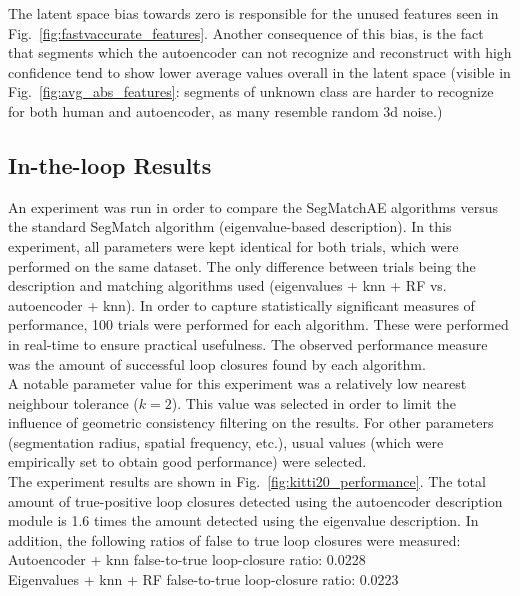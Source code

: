 The latent space bias towards zero is responsible for the unused features seen in Fig.~\ref{fig:fastvaccurate_features}. Another consequence of this bias, is the fact that segments which the autoencoder can not recognize and reconstruct with high confidence tend to show lower average values overall in the latent space (visible in Fig.~\ref{fig:avg_abs_features}: segments of unknown class are harder to recognize for both human and autoencoder, as many resemble random 3d noise.)


\subsection{In-the-loop Results}

An experiment was run in order to compare the SegMatchAE algorithms versus the standard SegMatch algorithm (eigenvalue-based description). In this experiment, all parameters were kept identical for both trials, which were performed on the same dataset. The only difference between trials being the description and matching algorithms used (eigenvalues + knn + RF vs. autoencoder + knn). In order to capture statistically significant measures of performance, 100 trials were performed for each algorithm. These were performed in real-time to ensure practical usefulness. The observed performance measure was the amount of successful loop closures found by each algorithm.\\ 

A notable parameter value for this experiment was a relatively low nearest neighbour tolerance ($k=2$). This value was selected in order to limit the influence of geometric consistency filtering on the results. For other parameters (segmentation radius, spatial frequency, etc.), usual values (which were empirically set to obtain good performance) were selected.\\

The experiment results are shown in Fig.~\ref{fig:kitti20_performance}. The total amount of true-positive loop closures detected using the autoencoder description module is 1.6 times the amount detected using the eigenvalue description. In addition, the following ratios of false to true loop closures were measured:\\

Autoencoder + knn false-to-true loop-closure ratio: 0.0228\\
Eigenvalues + knn + RF false-to-true loop-closure ratio: 0.0223\\

